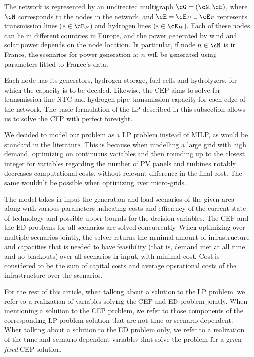 The network is represented by an undirected multigraph \(\cG = (\cN, \cE)\), where \(\cN\) corresponds to the nodes in the network, and \(\cE = \cE_H \cup \cE_P\) represents transmission lines (\(e \in \cE_P\)) and hydrogen lines (\(e \in \cE_H\)).
Each of these nodes can be in different countries in Europe, and the power generated by wind and solar power depends on the node location. 
In particular, if node \(n \in \cN\) is in France, the scenarios for power generation at \(n\) will be generated using parameters fitted to France's data.

Each node has its generators, hydrogen storage, fuel cells and hydrolyzers, for which the capacity is to be decided. 
Likewise, the CEP aims to solve for transmission line NTC and hydrogen pipe transmission capacity for each edge of the network. 
The basic formulation of the LP described in this subsection allows us to solve the CEP with perfect foresight. 

We decided to model our problem as a LP problem instead of MILP, as would be standard in the literature. 
This is because when modelling a large grid with high demand, optimizing on continuous variables and then rounding up to the closest integer for variables regarding the number of PV panels and turbines notably decreases computational costs, without relevant difference in the final cost. 
The same wouldn't be possible when optimizing over micro-grids.

The model takes in input the generation and load scenarios of the given area along with various parameters indicating costs and efficiency of the current state of technology and possible upper bounds for the decision variables. 
The CEP and the ED problems for all scenarios are solved concurrently. 
When optimizing over multiple scenarios jointly, the solver returns the minimal amount of infrastructure and capacities that is needed to have feasibility (that is, demand met at all time and no blackouts) over all scenarios in input, with minimal cost. 
Cost is considered to be the sum of capital costs and average operational costs of the infrastructure over the scenarios.

For the rest of this article, when talking about a solution to the LP problem, we refer to a realization of variables solving the CEP and ED problem jointly. 
When mentioning a solution to the CEP problem, we refer to those components of the corresponding LP problem solution that are not time or scenario dependent. 
When talking about a solution to the ED problem only, we refer to a realization of the time and scenario dependent variables that solve the problem for a given \textit{fixed} CEP solution.

